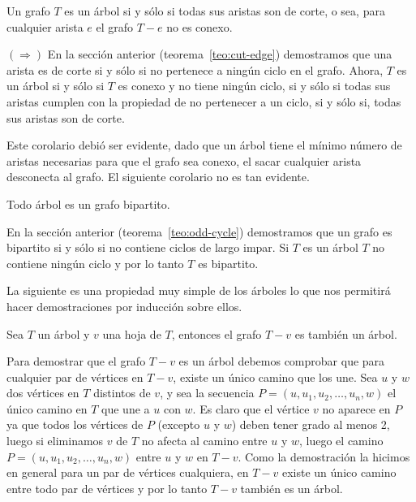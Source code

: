 \begin{corolario}
Un grafo $T$ es un árbol si y sólo si todas sus aristas son de corte, o sea, para cualquier arista $e$ el grafo $T-e$ no es conexo.

\begin{demostracion}\label{teo:cut-tree}
$(\Rightarrow)$ En la sección anterior (teorema~\ref{teo:cut-edge}) demostramos que una arista es de corte si y sólo si no pertenece a ningún ciclo en el grafo.
Ahora, $T$ es un árbol si y sólo si $T$ es conexo y no tiene ningún ciclo, si y sólo si todas sus aristas cumplen con la propiedad de no pertenecer a un ciclo, si y sólo si, todas sus aristas son de corte.
\end{demostracion}
\end{corolario}

Este corolario debió ser evidente, dado que un árbol tiene el mínimo número de aristas necesarias para que el grafo sea conexo, el sacar cualquier arista desconecta al grafo.
El siguiente corolario no es tan evidente.

\begin{corolario}
Todo árbol es un grafo bipartito.

\begin{demostracion}
En la sección anterior (teorema~\ref{teo:odd-cycle}) demostramos que un grafo es bipartito si y sólo si no contiene ciclos de largo impar.
Si $T$ es un árbol $T$ no contiene ningún ciclo y por lo tanto $T$ es bipartito.
\end{demostracion}
\end{corolario}

La siguiente es una propiedad muy simple de los árboles lo que nos permitirá hacer demostraciones por inducción sobre ellos.

\begin{lema}
Sea $T$ un árbol y $v$ una hoja de $T$, entonces el grafo $T-v$ es también un árbol.

\begin{demostracion}
Para demostrar que el grafo $T-v$ es un árbol debemos comprobar que para cualquier par de vértices en $T-v$, existe un único camino que los une.
Sea $u$ y $w$ dos vértices en $T$ distintos de $v$, y sea la secuencia $P=(u,u_1,u_2,\ldots,u_n,w)$ el único camino en $T$ que une a $u$ con $w$. 
Es claro que el vértice $v$ no aparece en $P$ ya que todos los vértices de $P$ (excepto $u$ y $w$) deben tener grado al menos 2, luego si eliminamos $v$ de $T$ no afecta al camino entre $u$ y $w$, luego el camino $P=(u,u_1,u_2,\ldots,u_n,w)$ entre $u$ y $w$ en $T-v$.
Como la demostración la hicimos en general para un par de vértices cualquiera, en $T-v$ existe un único camino entre todo par de vértices y por lo tanto $T-v$ también es un árbol.
\end{demostracion}
\end{lema}

